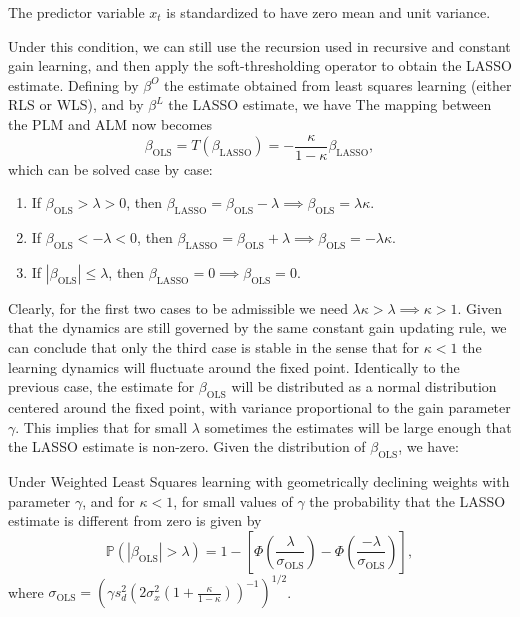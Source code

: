 \documentclass[11pt]{article}
\begin{document}
\begin{assumption}
    The predictor variable $x_t$ is standardized to have zero mean and unit variance.
\end{assumption}
Under this condition, we can still use the recursion used in recursive and constant gain learning, and then apply the soft-thresholding operator to obtain the LASSO estimate.
Defining by $\beta^{O}$ the estimate obtained from least squares learning (either RLS or WLS), and by $\beta^{L}$ the LASSO estimate, we have
The mapping between the PLM and ALM now becomes
\begin{equation}
    \beta_{\text{OLS}} = T(\beta_{\text{LASSO}}) = - \frac{\kappa}{1 - \kappa} \beta_{\text{LASSO}},
\end{equation}
which can be solved case by case:
\begin{enumerate}
    \item If $\beta_{\text{OLS}} > \lambda > 0$, then $\beta_{\text{LASSO}} = \beta_{\text{OLS}} - \lambda \implies \beta_{\text{OLS}} =  \lambda \kappa$.
    \item If $\beta_{\text{OLS}} < -\lambda < 0$, then $\beta_{\text{LASSO}} = \beta_{\text{OLS}} + \lambda \implies \beta_{\text{OLS}} = - \lambda \kappa$.
    \item If $|\beta_{\text{OLS}}| \leq \lambda$, then $\beta_{\text{LASSO}} = 0 \implies \beta_{\text{OLS}} = 0$.
\end{enumerate}
Clearly, for the first two cases to be admissible we need $\lambda \kappa > \lambda \implies \kappa > 1$.
Given that the dynamics are still governed by the same constant gain updating rule, we can conclude that only the third case is stable in the sense that for $\kappa < 1$ the learning dynamics will fluctuate around the fixed point.
Identically to the previous case, the estimate for $\beta_{\text{OLS}}$ will be distributed as a normal distribution centered around the fixed point, with variance proportional to the gain parameter $\gamma$.
This implies that for small $\lambda$ sometimes the estimates will be large enough that the LASSO estimate is non-zero.
Given the distribution of $\beta_{\text{OLS}}$, we have:

\begin{proposition}
    Under Weighted Least Squares learning with geometrically declining weights 
    with parameter $\gamma$, and for $\kappa < 1$, for small values of $\gamma$ the probability that the LASSO estimate is different from zero is given by
\begin{equation}
    \mathbb{P}(|{\beta}_{\text{OLS}}| > \lambda) 
    = 1 - \left[\Phi\left(\frac{\lambda}{\sigma_{\text{OLS}}}\right) - \Phi\left(\frac{-\lambda}{\sigma_{\text{OLS}}}\right)\right],
\end{equation}
where $\sigma_{\text{OLS}} =  \left(\gamma s_{d}^2 \left(2 \sigma^2_x \left(1 + \frac{\kappa}{1 - \kappa} \right)\right)^{-1}\right)^{1/2}$. 
\end{proposition}
\end{document}
